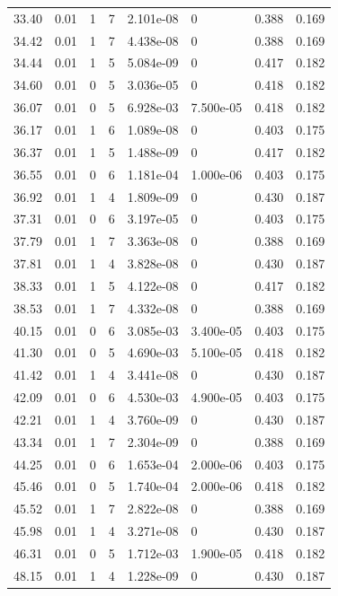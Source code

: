 \documentclass[preview]{standalone}
\begin{document}
{{{\begin{tabular}{L{1.2cm}C{1.2cm} C{0.3cm}C{0.5cm} C{1.4cm}C{1.4cm} C{1.4cm}C{1.4cm}}
  33.40  &  0.01  & 1     &  7 &  2.101e-08  & 0  & 0.388 &  0.169   \\ 
  34.42  &  0.01  & 1     &  7 &  4.438e-08  & 0  & 0.388 &  0.169   \\ 
  34.44  &  0.01  & 1     &  5 &  5.084e-09  & 0  & 0.417 &  0.182   \\ 
  34.60  &  0.01  & 0     &  5 &  3.036e-05  & 0  & 0.418 &  0.182   \\ 
  36.07  &  0.01  & 0     &  5 &  6.928e-03  & 7.500e-05  & 0.418 &  0.182   \\ 
  36.17  &  0.01  & 1     &  6 &  1.089e-08  & 0  & 0.403 &  0.175   \\ 
  36.37  &  0.01  & 1     &  5 &  1.488e-09  & 0  & 0.417 &  0.182   \\ 
  36.55  &  0.01  & 0     &  6 &  1.181e-04  & 1.000e-06  & 0.403 &  0.175   \\ 
  36.92  &  0.01  & 1     &  4 &  1.809e-09  & 0  & 0.430 &  0.187   \\ 
  37.31  &  0.01  & 0     &  6 &  3.197e-05  & 0  & 0.403 &  0.175   \\ 
  37.79  &  0.01  & 1     &  7 &  3.363e-08  & 0  & 0.388 &  0.169   \\ 
  37.81  &  0.01  & 1     &  4 &  3.828e-08  & 0  & 0.430 &  0.187   \\ 
  38.33  &  0.01  & 1     &  5 &  4.122e-08  & 0  & 0.417 &  0.182   \\ 
  38.53  &  0.01  & 1     &  7 &  4.332e-08  & 0  & 0.388 &  0.169   \\ 
  40.15  &  0.01  & 0     &  6 &  3.085e-03  & 3.400e-05  & 0.403 &  0.175   \\ 
  41.30  &  0.01  & 0     &  5 &  4.690e-03  & 5.100e-05  & 0.418 &  0.182   \\ 
  41.42  &  0.01  & 1     &  4 &  3.441e-08  & 0  & 0.430 &  0.187   \\ 
  42.09  &  0.01  & 0     &  6 &  4.530e-03  & 4.900e-05  & 0.403 &  0.175   \\ 
  42.21  &  0.01  & 1     &  4 &  3.760e-09  & 0  & 0.430 &  0.187   \\ 
  43.34  &  0.01  & 1     &  7 &  2.304e-09  & 0  & 0.388 &  0.169   \\ 
  44.25  &  0.01  & 0     &  6 &  1.653e-04  & 2.000e-06  & 0.403 &  0.175   \\ 
  45.46  &  0.01  & 0     &  5 &  1.740e-04  & 2.000e-06  & 0.418 &  0.182   \\ 
  45.52  &  0.01  & 1     &  7 &  2.822e-08  & 0  & 0.388 &  0.169   \\ 
  45.98  &  0.01  & 1     &  4 &  3.271e-08  & 0  & 0.430 &  0.187   \\ 
  46.31  &  0.01  & 0     &  5 &  1.712e-03  & 1.900e-05  & 0.418 &  0.182   \\ 
  48.15  &  0.01  & 1     &  4 &  1.228e-09  & 0  & 0.430 &  0.187   \\ 
\hline 
\end{tabular} 

}}}
\end{document}

